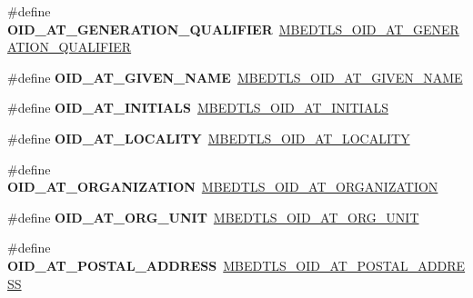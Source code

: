 \begin{DoxyCompactItemize}
\item 
\mbox{\label{compat-1_83_8h_a1702bf9272fafc48fc45cf8cd9ebc1da}} 
\#define {\bfseries O\+I\+D\+\_\+\+A\+T\+\_\+\+G\+E\+N\+E\+R\+A\+T\+I\+O\+N\+\_\+\+Q\+U\+A\+L\+I\+F\+I\+ER}~\mbox{\hyperlink{oid_8h_a0c0354f26066feb3f9da8a92bc7cbfda}{M\+B\+E\+D\+T\+L\+S\+\_\+\+O\+I\+D\+\_\+\+A\+T\+\_\+\+G\+E\+N\+E\+R\+A\+T\+I\+O\+N\+\_\+\+Q\+U\+A\+L\+I\+F\+I\+ER}}
\item 
\mbox{\label{compat-1_83_8h_a75a65e602a55bb1dee6ef3758a8956a9}} 
\#define {\bfseries O\+I\+D\+\_\+\+A\+T\+\_\+\+G\+I\+V\+E\+N\+\_\+\+N\+A\+ME}~\mbox{\hyperlink{oid_8h_ad82c6d34c40fd29eda37d7b1f35c7a0f}{M\+B\+E\+D\+T\+L\+S\+\_\+\+O\+I\+D\+\_\+\+A\+T\+\_\+\+G\+I\+V\+E\+N\+\_\+\+N\+A\+ME}}
\item 
\mbox{\label{compat-1_83_8h_ab1972fb1073e4db5f3dab0c668fcfc67}} 
\#define {\bfseries O\+I\+D\+\_\+\+A\+T\+\_\+\+I\+N\+I\+T\+I\+A\+LS}~\mbox{\hyperlink{oid_8h_a3dd24fca4f4e7ff5c0fda1b5adc282ea}{M\+B\+E\+D\+T\+L\+S\+\_\+\+O\+I\+D\+\_\+\+A\+T\+\_\+\+I\+N\+I\+T\+I\+A\+LS}}
\item 
\mbox{\label{compat-1_83_8h_a8bf92b78c353eb94242c3bb7fb6132a0}} 
\#define {\bfseries O\+I\+D\+\_\+\+A\+T\+\_\+\+L\+O\+C\+A\+L\+I\+TY}~\mbox{\hyperlink{oid_8h_a55a096dbc79a66c4e7729ca795f63bc3}{M\+B\+E\+D\+T\+L\+S\+\_\+\+O\+I\+D\+\_\+\+A\+T\+\_\+\+L\+O\+C\+A\+L\+I\+TY}}
\item 
\mbox{\label{compat-1_83_8h_acd142a502a8d344cb50866a943919202}} 
\#define {\bfseries O\+I\+D\+\_\+\+A\+T\+\_\+\+O\+R\+G\+A\+N\+I\+Z\+A\+T\+I\+ON}~\mbox{\hyperlink{oid_8h_ad9db6deb1609351cf1eac7d2ca32b80b}{M\+B\+E\+D\+T\+L\+S\+\_\+\+O\+I\+D\+\_\+\+A\+T\+\_\+\+O\+R\+G\+A\+N\+I\+Z\+A\+T\+I\+ON}}
\item 
\mbox{\label{compat-1_83_8h_a63813c045ecc53bdadad08578fb68e09}} 
\#define {\bfseries O\+I\+D\+\_\+\+A\+T\+\_\+\+O\+R\+G\+\_\+\+U\+N\+IT}~\mbox{\hyperlink{oid_8h_af764cca645e3b046a9a001d786d70715}{M\+B\+E\+D\+T\+L\+S\+\_\+\+O\+I\+D\+\_\+\+A\+T\+\_\+\+O\+R\+G\+\_\+\+U\+N\+IT}}
\item 
\mbox{\label{compat-1_83_8h_ad2cd0ae349214d5fd83a1b56f188dff1}} 
\#define {\bfseries O\+I\+D\+\_\+\+A\+T\+\_\+\+P\+O\+S\+T\+A\+L\+\_\+\+A\+D\+D\+R\+E\+SS}~\mbox{\hyperlink{oid_8h_a25ff595205be812b0494c6c8280dd8b5}{M\+B\+E\+D\+T\+L\+S\+\_\+\+O\+I\+D\+\_\+\+A\+T\+\_\+\+P\+O\+S\+T\+A\+L\+\_\+\+A\+D\+D\+R\+E\+SS}}

\end{DoxyCompactItemize}
